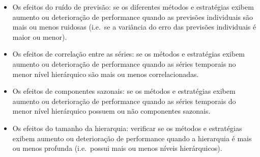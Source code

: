 \documentclass[
  12pt,
  twoside,
  openright,
  a4paper,
  chapter=TITLE,
  section=TITLE,
  brazil]{abntex2}
\providecommand{\tightlist}{%
  \setlength{\itemsep}{0pt}\setlength{\parskip}{0pt}}\usepackage{longtable,booktabs,array}
\begin{document}
\begin{itemize}
\tightlist
\item
  Os efeitos do ruído de previsão: se os diferentes métodos e
  estratégias exibem aumento ou deterioração de performance quando as
  previsões individuais são mais ou menos ruidosas (i.e.~se a variância
  do erro das previsões individuais é maior ou menor).
\item
  Os efeitos de correlação entre as séries: se os métodos e estratégias
  exibem aumento ou deterioração de performance quando as séries
  temporais no menor nível hierárquico são mais ou menos
  correlacionadas.
\item
  Os efeitos de componentes sazonais: se os métodos e estratégias exibem
  aumento ou deterioração de performance quando as séries temporais do
  menor nível hierárquico possuem ou não componentes sazonais.
\item
  Os efeitos do tamanho da hierarquia: verificar se os métodos e
  estratégias exibem aumento ou deterioração de performance quando a
  hierarquia é mais ou menos profunda (i.e.~possui mais ou menos níveis
  hierárquicos).
\end{itemize}


\printbibliography[title=REFERÊNCIAS]


\postextual
\end{document}
